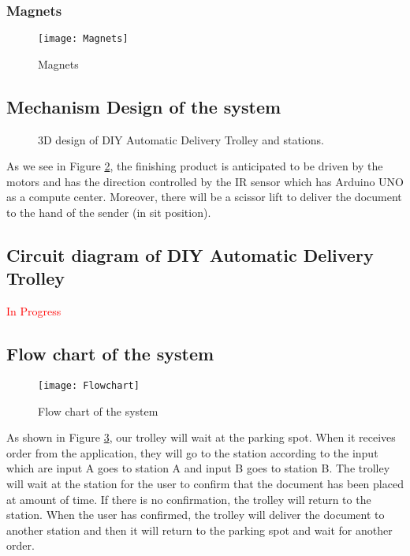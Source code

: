 \documentclass[12pt]{article}
\begin{document}
\subsubsection{Magnets} \label{subsub:magnets}

\begin{figure}[H]
	\centering
	\texttt{[image: Magnets]}
	\caption{Magnets} \label{fig:magnets}
\end{figure}

\subsection{Mechanism Design of the system} \label{sub:mechanism}

\begin{figure}[H]
	\centering
	 \hspace{1cm}
	\caption{3D design of DIY Automatic Delivery Trolley and stations.} \label{fig:3ddesign}
\end{figure}

As we see in Figure \ref{fig:3ddesign}, the finishing product is anticipated to be driven by the motors and has the direction controlled by the IR sensor which has Arduino UNO as a compute center. Moreover, there will be a scissor lift to deliver the document to the hand of the sender (in sit position).

\subsection{Circuit diagram of DIY Automatic Delivery Trolley} \label{sub:circuit}

\begin{center}
	\textcolor{red}{In Progress}
\end{center}

\subsection{Flow chart of the system}

\begin{figure}[H]
	\centering
	\texttt{[image: Flowchart]}
	\caption{Flow chart of the system} \label{fig:flowchart}
\end{figure}

As shown in Figure \ref{fig:flowchart}, our trolley will wait at the parking spot. When it receives order from the application, they will go to the station according to the input which are input A goes to station A and input B goes to station B. The trolley will wait at the station for the user to confirm that the document has been placed at amount of time. If there is no confirmation, the trolley will return to the station. When the user has confirmed, the trolley will deliver the document to another station and then it will return to the parking spot and wait for another order.
\end{document}
